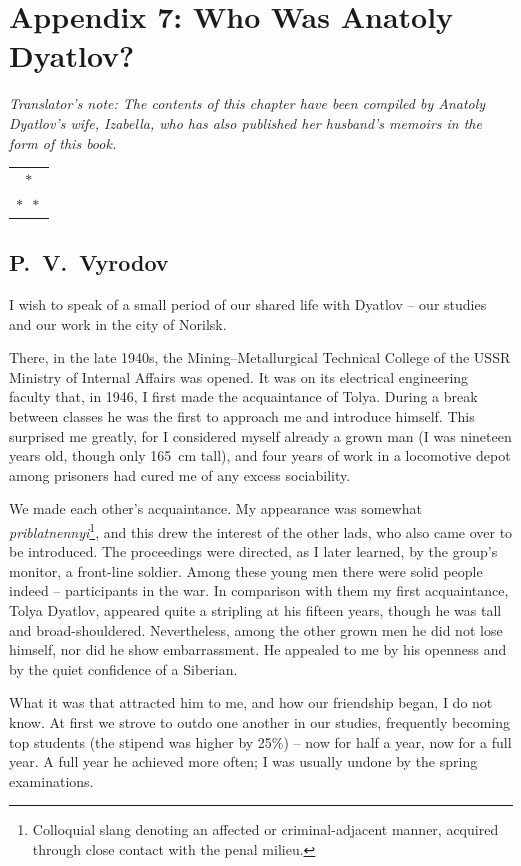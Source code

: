 \documentclass[openright]{bookest}
\newcommand{\varthreestars}{\begin{center}\begin{tabular}{c}$\ast$\\[-0.8ex] $\ast\enspace \ast $\end{tabular}\end{center}}
\begin{document}
\chapter*{Appendix 7: Who Was Anatoly Dyatlov?}

\begin{center}
  \textit{Translator's note: The contents of this chapter have been compiled by Anatoly Dyatlov's wife, Izabella, who has also published her husband's memoirs in the form of this book.}
\end{center}

\varthreestars

\section*{P.~V.~Vyrodov}

I wish to speak of a small period of our shared life with Dyatlov -- our studies and our work in the city of Norilsk.

There, in the late 1940s, the Mining--Metallurgical Technical College of the USSR Ministry of Internal Affairs was opened. It was on its electrical engineering faculty that, in 1946, I first made the acquaintance of Tolya. During a break between classes he was the first to approach me and introduce himself. This surprised me greatly, for I considered myself already a grown man (I was nineteen years old, though only \qty{165}{\centi\metre} tall), and four years of work in a locomotive depot among prisoners had cured me of any excess sociability.

We made each other's acquaintance. My appearance was somewhat \textit{priblatnennyi}\footnote{Colloquial slang denoting an affected or criminal-adjacent manner, acquired through close contact with the penal milieu.}, and this drew the interest of the other lads, who also came over to be introduced. The proceedings were directed, as I later learned, by the group's monitor, a front-line soldier. Among these young men there were solid people indeed -- participants in the war. In comparison with them my first acquaintance, Tolya Dyatlov, appeared quite a stripling at his fifteen years, though he was tall and broad-shouldered. Nevertheless, among the other grown men he did not lose himself, nor did he show embarrassment. He appealed to me by his openness and by the quiet confidence of a Siberian.

What it was that attracted him to me, and how our friendship began, I do not know. At first we strove to outdo one another in our studies, frequently becoming top students (the stipend was higher by 25\%) -- now for half a year, now for a full year. A full year he achieved more often; I was usually undone by the spring examinations.
\end{document}
